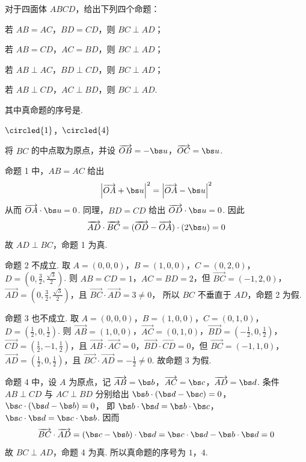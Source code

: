 \begin{problem}
对于四面体 \(ABCD\)，给出下列四个命题：

\begin{circlelist}
\item 若 \(AB = AC\)，\(BD = CD\)，则 \(BC \perp AD\)；
\item 若 \(AB = CD\)，\(AC = BD\)，则 \(BC \perp AD\)；
\item 若 \(AB \perp AC\)，\(BD \perp CD\)，则 \(BC \perp AD\)；
\item 若 \(AB \perp CD\)，\(AC \perp BD\)，则 \(BC \perp AD\).
\end{circlelist}

其中真命题的序号是\fillinblank{}.
\end{problem}

\begin{answer}
\(\circled{1}\)，\(\circled{4}\)
\end{answer}

\begin{solution}
将 \(BC\) 的中点取为原点，并设 \(\overrightarrow{OB}=-\bs u\)，\(\overrightarrow{OC}=\bs u\).

命题 1 中，\(AB=AC\) 给出
\[
\left|\overrightarrow{OA}+\bs u\right|^{2}=\left|\overrightarrow{OA}-\bs u\right|^{2}
\]
从而 \(\overrightarrow{OA}\cdot\bs u=0\). 同理，\(BD=CD\) 给出 \(\overrightarrow{OD}\cdot\bs u=0\). 因此
\[
\overrightarrow{AD}\cdot\overrightarrow{BC}=(\overrightarrow{OD}-\overrightarrow{OA})\cdot(2\bs u)=0
\]
故 \(AD\perp BC\)，命题 1 为真.

命题 2 不成立. 取 \(A=(0,0,0)\)，\(B=(1,0,0)\)，\(C=(0,2,0)\)，\(D=\left(0,\frac32,\frac{\sqrt3}{2}\right)\). 则 \(AB=CD=1\)，\(AC=BD=2\)，但 \(\overrightarrow{BC}=(-1,2,0)\)，\(\overrightarrow{AD}=\left(0,\frac32,\frac{\sqrt3}{2}\right)\)，且 \(\overrightarrow{BC}\cdot\overrightarrow{AD}=3\ne0\)，
所以 \(BC\) 不垂直于 \(AD\)，命题 2 为假.

命题 3 也不成立. 取 \(A=(0,0,0)\)，\(B=(1,0,0)\)，\(C=(0,1,0)\)，\(D=\left(\frac12,0,\frac12\right)\). 则 \(\overrightarrow{AB}=(1,0,0)\)，\(\overrightarrow{AC}=(0,1,0)\)，\(\overrightarrow{BD}=\left(-\frac12,0,\frac12\right)\)，\(\overrightarrow{CD}=\left(\frac12,-1,\frac12\right)\)，且 \(\overrightarrow{AB}\cdot\overrightarrow{AC}=0\)，\(\overrightarrow{BD}\cdot\overrightarrow{CD}=0\)，但 \(\overrightarrow{BC}=(-1,1,0)\)，\(\overrightarrow{AD}=\left(\frac12,0,\frac12\right)\)，且 \(\overrightarrow{BC}\cdot\overrightarrow{AD}=-\frac12\ne0\).
故命题 3 为假.

命题 4 中，设 \(A\) 为原点，记 \(\overrightarrow{AB}=\bs b\)，\(\overrightarrow{AC}=\bs c\)，\(\overrightarrow{AD}=\bs d\). 条件 \(AB\perp CD\) 与 \(AC\perp BD\) 分别给出 \(\bs b\cdot(\bs d-\bs c)=0\)，\(\bs c\cdot(\bs d-\bs b)=0\)，
即 \(\bs b\cdot\bs d=\bs b\cdot\bs c\)，\(\bs c\cdot\bs d=\bs c\cdot\bs b\). 因而
\[
\overrightarrow{BC}\cdot\overrightarrow{AD}=(\bs c-\bs b)\cdot\bs d=\bs c\cdot\bs d-\bs b\cdot\bs d=0
\]
故 \(BC\perp AD\)，命题 4 为真. 所以真命题的序号为 \(1\)，\(4\).
\end{solution}

